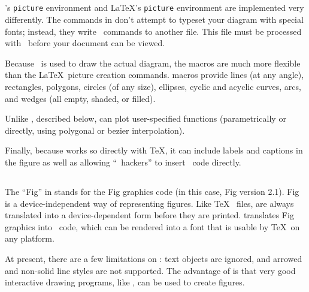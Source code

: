 \subsection{\protect\MFPic}

\program{\MFPic}'s \verb|picture| environment and \LaTeX's \verb|picture| environment
are implemented very differently.
The commands
in \program{\MFPic} don't attempt to typeset your diagram with special fonts;
instead, they write \MF\ commands to another file.  This file must be
processed with \MF\ before your document can be viewed.

Because \MF\ is used to draw the actual diagram, the \program{\MFPic} macros
are much more flexible than the \LaTeX\ picture creation commands.
\program{\MFPic} macros provide lines (at any angle), rectangles, polygons,
circles (of any size), ellipses, cyclic and acyclic curves,
arcs, and wedges (all empty, shaded, or filled). 

Unlike \program{\FigMF}, described below, \program{\MFPic} can plot user-specified functions
(parametrically or directly, using polygonal or bezier interpolation).

Finally, because \program{\MFPic} works so directly with \TeX, it can include
labels and captions in the figure as well as allowing ``\MF\ hackers''
to insert \MF\ code directly.

\subsection{\protect\FigMF}
\label{sec:Fig}

The ``Fig'' in  stands for the Fig graphics code (in this
case, Fig version 2.1).  Fig is a device-independent way of
representing figures.  Like \TeX\  files,  are
always translated into a device-dependent form before they are
printed.  
\program{\FigMF} translates Fig graphics into \MF\ code, which can be rendered
into a font that is usable by \TeX\ on any platform.  

At present, there are a few limitations on \program{\FigMF}: text objects are
ignored, and arrowed and non-solid line styles are not supported.  
The advantage of \program{\FigMF} is that very good interactive drawing programs,
like , can be used to create figures.

\subsection{\protect\MF}

